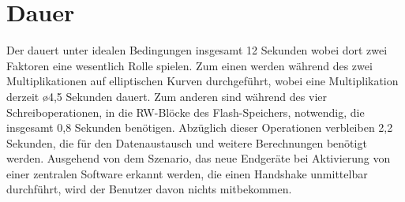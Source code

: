 \section{Dauer}

Der  dauert unter idealen Bedingungen insgesamt 12 Sekunden wobei dort zwei Faktoren eine wesentlich Rolle spielen.
Zum einen werden während des  zwei Multiplikationen auf elliptischen Kurven durchgeführt, wobei eine Multiplikation derzeit \o 4,5 Sekunden dauert.
Zum anderen sind während des  vier Schreiboperationen, in die RW-Blöcke des Flash-Speichers, notwendig, die insgesamt 0,8 Sekunden benötigen.
Abzüglich dieser Operationen verbleiben 2,2 Sekunden, die für den Datenaustausch und weitere Berechnungen benötigt werden.
Ausgehend von dem Szenario, das neue Endgeräte bei Aktivierung von einer zentralen Software erkannt werden, die einen Handshake unmittelbar durchführt,
wird der Benutzer davon nichts mitbekommen.